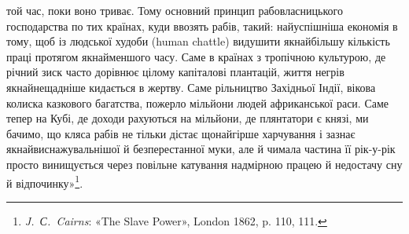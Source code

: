 \parcont{}  %
той час, поки воно триває. Тому основний принцип рабовласницького
господарства по тих країнах, куди ввозять рабів, такий:
найуспішніша економія в тому, щоб із людської худоби (human
chattle) видушити якнайбільшу кількість праці протягом якнайменшого
часу. Саме в країнах з тропічною культурою, де річний
зиск часто дорівнює цілому капіталові плантацій, життя негрів
якнайнещадніше кидається в жертву. Саме рільництво Західньої
Індії, вікова колиска казкового багатства, пожерло мільйони
людей африканської раси. Саме тепер на Кубі, де доходи рахуються
на мільйони, де плянтатори є князі, ми бачимо, що кляса
рабів не тільки дістає щонайгірше харчування і зазнає якнайвиснажувальнішої
й безперестанної муки, але й чимала частина
її рік-у-рік просто винищується через повільне катування
надмірною працею й недостачу сну й відпочинку»\footnote{
\emph{J.~С.~Cairns}: «The Slave Power», London 1862, p. 110, 111.
}.

